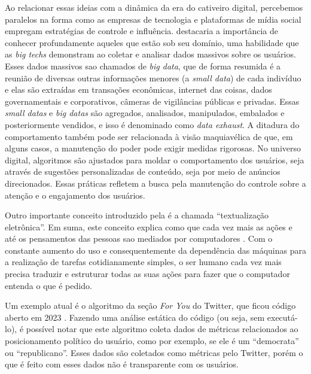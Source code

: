 \documentclass[
	12pt,
	openright,
	twoside,
	a4paper,
	english,
	french,
	spanish,
	brazil
]{abntex2}
\begin{document}
  Ao relacionar essas ideias com a dinâmica da era do cativeiro digital,
  percebemos paralelos na forma como as empresas de tecnologia e plataformas de
  mídia social empregam estratégias de controle e influência.
   destacaria a importância de conhecer
  profundamente aqueles que estão sob seu domínio, uma habilidade que as
  \textit{big techs} demonstram ao coletar e analisar dados massivos sobre os
  usuários. Esses dados massivos sao chamados de \textit{big data}, que de forma
  resumida é a reunião de diversas outras informações menores (a
  \textit{small data}) de cada indivíduo e elas são extraídas em transações
  econômicas, internet das coisas, dados governamentais e corporativos, câmeras
  de vigilâncias públicas e privadas. Essas \textit{small datas} e
  \textit{big datas} são agregados, analisados, manipulados, embalados e
  posteriormente vendidos, e isso é denominado como \textit{data exhaust}. A
  ditadura do comportamento também pode ser relacionada à visão maquiavélica de
  que, em alguns casos, a manutenção do poder pode exigir medidas rigorosas. No
  universo digital, algoritmos são ajustados para moldar o comportamento dos
  usuários, seja através de sugestões personalizadas de conteúdo, seja por meio
  de anúncios direcionados. Essas práticas refletem a busca pela manutenção do
  controle sobre a atenção e o engajamento dos usuários.

  Outro importante conceito introduzido pela
   é a chamada ``textualização
  eletrônica''. Em suma, este conceito explica como que cada vez mais as ações e
  até os pensamentos das pessoas sao mediados por computadores
  \cite{zuboff-capitalismo-vigilancia}. Com o constante aumento do uso e
  consequentemente da dependência das máquinas para a realização de tarefas
  cotidianamente simples, o ser humano cada vez mais precisa traduzir e
  estruturar todas as suas ações para fazer que o computador entenda o que é
  pedido.

  Um exemplo atual é o algoritmo da seção \textit{For You} do Twitter, que ficou
  código aberto em 2023 \cite{github-for-you}. Fazendo uma análise estática do
  código (ou seja, sem executá-lo), é possível notar que este algoritmo coleta
  dados de métricas relacionados ao posicionamento político do usuário, como por
  exemplo, se ele é um ``democrata'' ou ``republicano''. Esses dados são
  coletados como métricas pelo Twitter, porém o que é feito com esses dados não
  é transparente com os usuários.
\end{document}

